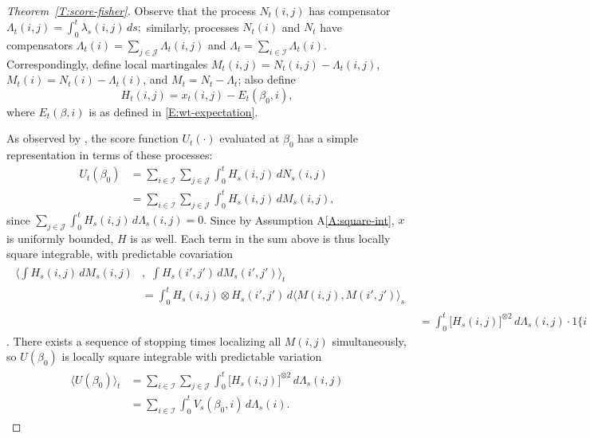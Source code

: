 \documentclass[final]{statsoc}
\begin{document}
\begin{proof}[Theorem~\ref{T:score-fisher}]
Observe that the process $N_t(i,j)$ has compensator
\(
    \Lambda_t(i,j)
        =
            \int_0^t \lambda_s(i,j) \, ds;
\)
similarly, processes $N_t(i)$ and $N_t$ have compensators
$\Lambda_t(i) = \sum_{j \in \mathcal{J}} \Lambda_t(i,j)$
and $\Lambda_t = \sum_{i \in \mathcal{I}} \Lambda_t(i)$.  Correspondingly,
define local martingales $M_t(i,j) = N_t(i,j) - \Lambda_t(i,j)$,
$M_t(i) = N_t(i) - \Lambda_t(i)$, and $M_t = N_t - \Lambda_t$;
also define
\[
    H_t(i,j)
        =
        x_t(i,j) - E_t(\beta_0,i),
\]
where $E_t(\beta,i)$ is as defined in \eqref{E:wt-expectation}.

As observed by \citet{andersen1982cox}, the score function
$U_t(\cdot)$ evaluated at $\beta_0$ has
a simple representation in terms of these processes:
\begin{align*}
    U_t(\beta_0)
        &=
        \sum_{i \in \mathcal{I}}
        \sum_{j \in \mathcal{J}}
        \int_0^t
            H_s(i,j) \, dN_s(i,j) \\
        &=
        \sum_{i \in \mathcal{I}}
        \sum_{j \in \mathcal{J}}
        \int_0^t
            H_s(i,j) \, dM_s(i,j),
\end{align*}
since
\(
    \sum_{j \in \mathcal{J}}
    \int_0^t
        H_s(i,j) \,
        d\Lambda_s(i,j)
    =
    0.
\)
Since by Assumption A\ref{A:square-int}, $x$ is uniformly bounded, $H$
is as well.  Each term in the sum above is thus locally square integrable,
with predictable covariation
\begin{align*}
    \begin{split}
        \bigg\langle
            \int
                H_s(i,j) \, dM_s(i,j)
        &, \, \,
            \int
                H_s(i',j') \, dM_s(i',j')
        \bigg\rangle_t \\
        &=
            \int_0^t
                H_s(i,j) \otimes H_s(i',j') \,
                d\big\langle M(i,j), M(i',j')\big\rangle_s
    \end{split} \\
        &=
            \int_0^t
                \big[ H_s(i,j) \big]^{\otimes 2} \,
                d\Lambda_s(i,j)
            \cdot
            1\{ i = i', j = j' \}
\end{align*}
\citep[Thm.~2.4.3]{fleming1991counting}.  There exists a sequence
of stopping times localizing all $M(i,j)$ simultaneously, so $U(\beta_0)$ is
locally square integrable with predictable variation
\begin{align}
\begin{split}\label{E:score-compensator}
    \big\langle U(\beta_0) \big\rangle_t
        &=
            \sum_{i \in \mathcal{I}}
            \sum_{j \in \mathcal{J}}
            \int_0^t
                \big[ H_s(i,j) \big]^{\otimes 2} \,
                d\Lambda_s(i,j) \\
        &=
            \sum_{i \in \mathcal{I}}
            \int_0^t
                V_s(\beta_0, i) \,
                d\Lambda_s(i).
\end{split}
\end{align}


\end{proof}
\end{document}
